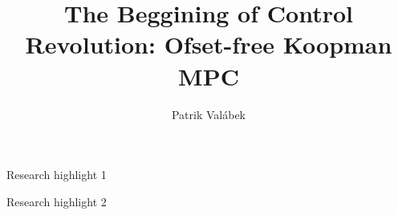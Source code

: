 \documentclass[preprint,12pt,authoryear]{elsarticle}
\begin{document}
\begin{frontmatter}



\title{The Beggining of Control Revolution: Ofset-free Koopman MPC} %


\author{Patrik Valábek} %


\begin{abstract}

\end{abstract}


\begin{highlights}
\item Research highlight 1
\item Research highlight 2
\end{highlights}

\begin{keyword}



\end{keyword}

\end{frontmatter}
\end{document}
